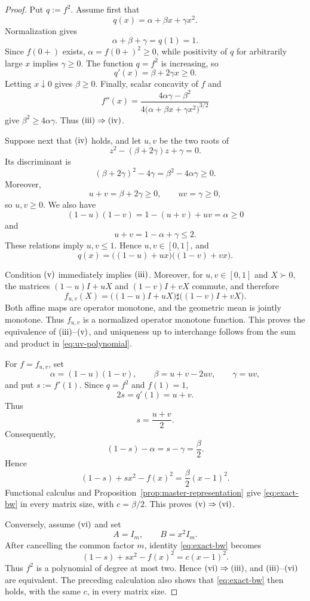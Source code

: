 \documentclass[11pt]{amsart}
\theoremstyle{definition}
\theoremstyle{remark}
\begin{document}
\begin{proof}
	Put $q:=f^2$.  Assume first that
	\[
	q(x)=\alpha+\beta x+\gamma x^2.
	\]
	Normalization gives
	\[
	\alpha+\beta+\gamma=q(1)=1.
	\]
	Since $f(0+)$ exists, $\alpha=f(0+)^2\ge0$, while positivity of
	$q$ for arbitrarily large $x$ implies $\gamma\ge0$.  The function
	$q=f^2$ is increasing, so
	\[
	q'(x)=\beta+2\gamma x\ge0.
	\]
	Letting $x\downarrow0$ gives $\beta\ge0$.  Finally, scalar
	concavity of $f$ and
	\[
	f''(x)=
	\frac{4\alpha\gamma-\beta^2}
	{4\bigl(\alpha+\beta x+\gamma x^2\bigr)^{3/2}}
	\]
	give $\beta^2\ge4\alpha\gamma$.  Thus
	${\rm(iii)}\Rightarrow{\rm(iv)}$.
	
	Suppose next that ${\rm(iv)}$ holds, and let $u,v$ be the two
	roots of
	\begin{equation}\label{eq:uv-polynomial}
		z^2-(\beta+2\gamma)z+\gamma=0.
	\end{equation}
	Its discriminant is
	\[
	(\beta+2\gamma)^2-4\gamma
	=\beta^2-4\alpha\gamma\ge0.
	\]
	Moreover,
	\[
	u+v=\beta+2\gamma\ge0,
	\qquad
	uv=\gamma\ge0,
	\]
	so $u,v\ge0$.  We also have
	\[
	(1-u)(1-v)=1-(u+v)+uv=\alpha\ge0
	\]
	and
	\[
	u+v=1-\alpha+\gamma\le2.
	\]
	These relations imply $u,v\le1$.  Hence $u,v\in[0,1]$, and
	\[
	q(x)=\bigl((1-u)+ux\bigr)\bigl((1-v)+vx\bigr).
	\]
	
	Condition ${\rm(v)}$ immediately implies ${\rm(iii)}$.  Moreover,
	for $u,v\in[0,1]$ and $X\succ0$, the matrices
	$(1-u)I+uX$ and $(1-v)I+vX$ commute, and therefore
	\[
	f_{u,v}(X)
	=\bigl((1-u)I+uX\bigr)
	\sharp
	\bigl((1-v)I+vX\bigr).
	\]
	Both affine maps are operator monotone, and the geometric mean is
	jointly monotone.  Thus $f_{u,v}$ is a normalized operator monotone
	function.  This proves the equivalence of
	${\rm(iii)}$--${\rm(v)}$, and uniqueness up to interchange follows
	from the sum and product in \eqref{eq:uv-polynomial}.
	
For $f=f_{u,v}$, set
\[
\alpha=(1-u)(1-v),
\qquad
\beta=u+v-2uv,
\qquad
\gamma=uv,
\]
and put $s:=f'(1)$.  Since $q=f^2$ and $f(1)=1$,
\[
2s=q'(1)=u+v.
\]
Thus
\[
s=\frac{u+v}{2}.
\]
Consequently,
\[
(1-s)-\alpha=s-\gamma=\frac{\beta}{2}.
\]
Hence
	\[
	(1-s)+sx^2-f(x)^2=\frac{\beta}{2}(x-1)^2.
	\]
	Functional calculus and
	Proposition~\ref{prop:master-representation} give
	\eqref{eq:exact-bw} in every matrix size, with
	$c=\beta/2$.  This proves
	${\rm(v)}\Rightarrow{\rm(vi)}$.
	
	Conversely, assume ${\rm(vi)}$ and set
	\[
	A=I_m,
	\qquad
	B=x^2I_m.
	\]
	After cancelling the common factor $m$, identity
	\eqref{eq:exact-bw} becomes
	\[
	(1-s)+sx^2-f(x)^2=c(x-1)^2.
	\]
	Thus $f^2$ is a polynomial of degree at most two.  Hence
	${\rm(vi)}\Rightarrow{\rm(iii)}$, and
	${\rm(iii)}$--${\rm(vi)}$ are equivalent.  The preceding
	calculation also shows that \eqref{eq:exact-bw} then holds, with the
	same $c$, in every matrix size.
	

\end{proof}
\end{document}
